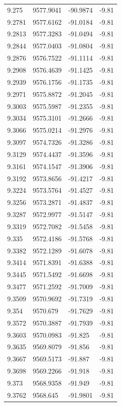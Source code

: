 \begin{table}[H]
\begin{tabular}{llll}
9.275 & 9577.9041 & -90.9874 & -9.81 \\
9.2781 & 9577.6162 & -91.0184 & -9.81 \\
9.2813 & 9577.3283 & -91.0494 & -9.81 \\
9.2844 & 9577.0403 & -91.0804 & -9.81 \\
9.2876 & 9576.7522 & -91.1114 & -9.81 \\
9.2908 & 9576.4639 & -91.1425 & -9.81 \\
9.2939 & 9576.1756 & -91.1735 & -9.81 \\
9.2971 & 9575.8872 & -91.2045 & -9.81 \\
9.3003 & 9575.5987 & -91.2355 & -9.81 \\
9.3034 & 9575.3101 & -91.2666 & -9.81 \\
9.3066 & 9575.0214 & -91.2976 & -9.81 \\
9.3097 & 9574.7326 & -91.3286 & -9.81 \\
9.3129 & 9574.4437 & -91.3596 & -9.81 \\
9.3161 & 9574.1547 & -91.3906 & -9.81 \\
9.3192 & 9573.8656 & -91.4217 & -9.81 \\
9.3224 & 9573.5764 & -91.4527 & -9.81 \\
9.3256 & 9573.2871 & -91.4837 & -9.81 \\
9.3287 & 9572.9977 & -91.5147 & -9.81 \\
9.3319 & 9572.7082 & -91.5458 & -9.81 \\
9.335 & 9572.4186 & -91.5768 & -9.81 \\
9.3382 & 9572.1289 & -91.6078 & -9.81 \\
9.3414 & 9571.8391 & -91.6388 & -9.81 \\
9.3445 & 9571.5492 & -91.6698 & -9.81 \\
9.3477 & 9571.2592 & -91.7009 & -9.81 \\
9.3509 & 9570.9692 & -91.7319 & -9.81 \\
9.354 & 9570.679 & -91.7629 & -9.81 \\
9.3572 & 9570.3887 & -91.7939 & -9.81 \\
9.3603 & 9570.0983 & -91.825 & -9.81 \\
9.3635 & 9569.8079 & -91.856 & -9.81 \\
9.3667 & 9569.5173 & -91.887 & -9.81 \\
9.3698 & 9569.2266 & -91.918 & -9.81 \\
9.373 & 9568.9358 & -91.949 & -9.81 \\
9.3762 & 9568.645 & -91.9801 & -9.81 \\

\end{tabular}
\end{table}

